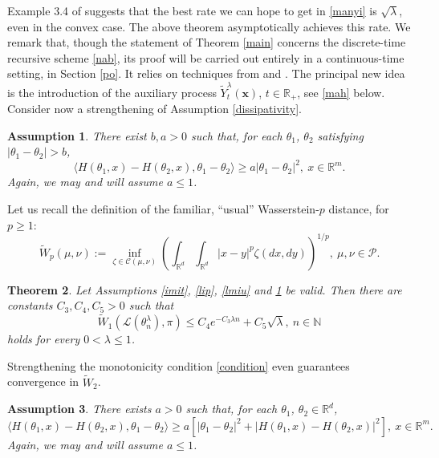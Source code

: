 \documentclass[a4paper,draft]{article}
\newtheorem{theorem}{Theorem}[section]
\newtheorem{assumption}[theorem]{Assumption}
\begin{document}
Example 3.4 of \cite{convex} suggests that the best rate we can hope to get in \eqref{manyi} is $\sqrt{\lambda}$, even in the convex case. The above theorem asymptotically achieves this rate.
We remark that, though
the statement of Theorem \ref{main} concerns the discrete-time recursive
scheme \eqref{nab}, its proof will
be carried out entirely in a continuous-time setting, in Section \ref{po}. It relies
on techniques from \cite{convex} and \cite{eberle}. The principal new idea is
the introduction of the auxiliary process $\tilde{Y}^{\lambda}_t(\mathbf{x})$, $t\in\mathbb{R}_+$,
see \eqref{mah} below.
Consider now a strengthening of Assumption \ref{dissipativity}.

\begin{assumption}\label{coc}
There exist $b,a>0$ such that, for each $\theta_1$, $\theta_2$ satisfying
$|\theta_1-\theta_2|>b$,
\begin{equation}\label{condition}
\langle H(\theta_1,x)-H(\theta_2,x),\theta_1-\theta_2\rangle\geq a |\theta_1-\theta_2|^2,\ x\in\mathbb{R}^m.
\end{equation}
Again, we may and will assume $a\leq 1$.
\end{assumption}

Let us recall the definition of the familiar, ``usual'' Wasserstein-$p$ distance, for $p\geq 1$:
\begin{equation}\label{family}
\tilde{W}_p(\mu,\nu):=\inf_{\zeta\in\mathcal{C}(\mu,\nu)}
\left(\int_{\mathbb{R}^d}\int_{\mathbb{R}^d}|x-y|^p\zeta(dx,dy)\right)^{1/p},\ \mu,\nu\in\mathcal{P}.
\end{equation}

\begin{theorem}\label{mainv} Let Assumptions \ref{imit}, \ref{lip}, \ref{lmiu} and \ref{coc}
be valid. Then there are constants
$C_3,C_4,C_5>0$ such that
\begin{equation}\label{menyi}
\tilde{W}_1(\mathcal{L}(\theta^{\lambda}_n),\pi)\leq C_4 e^{-C_3\lambda n} +C_5\sqrt{\lambda},\ n\in\mathbb{N}
\end{equation}
holds for every $0<\lambda\leq 1$.
\end{theorem}

Strengthening the monotonicity condition \eqref{condition} even guarantees convergence in $\tilde{W}_2$.

\begin{assumption}\label{coc1}
There exists $a>0$ such that, for each $\theta_1$, $\theta_2\in\mathbb{R}^d$,
$$
\langle H(\theta_1,x)-H(\theta_2,x),\theta_1-\theta_2\rangle\geq a [|\theta_1-\theta_2|^2+|H(\theta_1,x)-
H(\theta_2,x)|^2],\ x\in\mathbb{R}^m.
$$
Again, we may and will assume $a\leq 1$.
\end{assumption}
\end{document}
